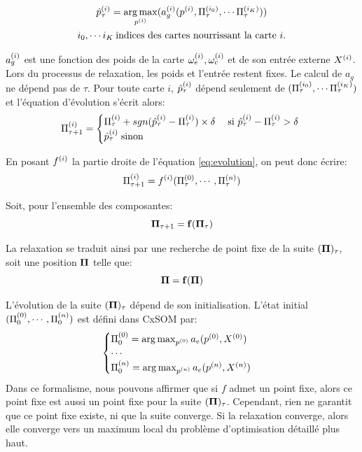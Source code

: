 \documentclass[../main]{subfiles}
\begin{document}
\begin{equation}
\begin{gathered}
\hat{p}^{({i})}_{\tau} = \operatorname*{arg\,max}_{p^{({i})}}(a_g^{({i})}(p^{({i})},\Pi^{({i_0})}_\tau, \cdots \Pi^{({i_K})}_\tau))\\
 i_0, \cdots i_K \: \text{indices des cartes nourrissant la carte $i$}.
\end{gathered}
\label{eq:pstar}
\end{equation}

$a_g^{({i})}$ est une fonction des poids de la carte $\omega_{e}^{({i})}, \omega_{c}^{({i})}$ et de son entrée externe $X^{({i})}$. Lors du processus de relaxation, les poids et l'entrée restent fixes. Le calcul de $a_g$ ne dépend pas de $\tau$. Pour toute carte $i$, $\hat{p}^{({i})}_{\tau}$ dépend seulement de $(\Pi^{({i_0})}_\tau, \cdots \Pi^{({i_K})}_\tau)$ et
l'équation d'évolution s'écrit alors: 
\begin{equation}
\Pi^{({i})}_{\tau+1} = 
\begin{cases}
\Pi^{({i})}_{\tau} + sgn(\hat{p}^{({i})}_{\tau} - \Pi^{({i})}_{\tau}) \times \delta \; & \text{si $\hat{p}^{({i})}_{\tau} - \Pi^{({i})}_{\tau} > \delta$ } \\
\hat{p}^{({i})}_{\tau} \; \text{sinon}	
\end{cases}
\label{eq:evolution}
\end{equation}

En posant $f^{({i})}$ la partie droite de l'équation \ref{eq:evolution}, on peut donc écrire: 
\begin{equation}
\Pi^{({i})}_{\tau +1} = f^{({i})}(\Pi^{({0})}_\tau,\cdots,\Pi^{({n})}_\tau)
\label{eq:fonction}
\end{equation}

Soit, pour l'ensemble des composantes: 
\begin{equation}
\mathbf{\Pi}_{\tau+1} = \mathbf{f}(\mathbf{\Pi}_\tau)
\end{equation}

La relaxation se traduit ainsi par une recherche de point fixe de la suite $(\mathbf{\Pi})_{\tau}$, soit une position $\mathbf{\Pi}$ telle que:
\begin{equation}
\mathbf{\Pi} = \mathbf{f}(\mathbf{\Pi})
\label{eq:suite}
\end{equation}

L'évolution de la suite $(\mathbf{\Pi})_{\tau}$ dépend de son initialisation.
L'état initial $(\Pi^{({0})}_0, \cdots , \Pi^{({n})}_0)$ est défini dans CxSOM par: 
\begin{equation}
\begin{cases}
\Pi^{({0})}_0 = \operatorname*{arg\,max}_{p^{({0})}} a_e(p^{({0})},X^{({0})})\\
\cdots \\
\Pi^{({n})}_0 = \operatorname*{arg\,max}_{p^{({n})}} a_e(p^{({n})},X^{({n})})\\
\end{cases}
\label{eq:init}
\end{equation}
Dans ce formalisme, nous pouvons affirmer que si $f$ admet un point fixe, alors ce point fixe est aussi un point fixe pour la suite $(\mathbf{\Pi})_\tau$. Cependant, rien ne garantit que ce point fixe existe, ni que la suite converge.
Si la relaxation converge, alors elle converge vers un maximum local du problème d'optimisation détaillé plus haut.
\end{document}
